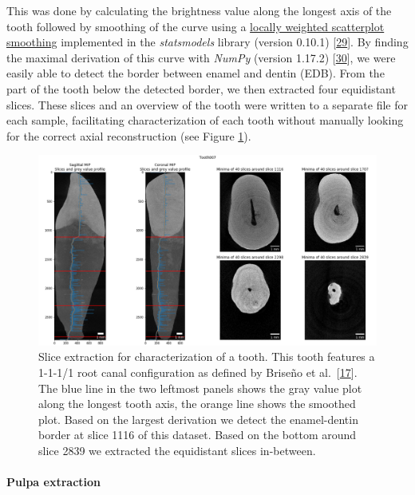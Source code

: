 \documentclass[
  american,
]{article}
\begin{document}
This was done by calculating the brightness value along the longest axis of the tooth followed by smoothing of the curve using a \href{https://www.statsmodels.org/devel/generated/statsmodels.nonparametric.smoothers_lowess.lowess.html}{locally weighted scatterplot smoothing} implemented in the \emph{statsmodels} library (version 0.10.1) {[}\protect\hyperlink{ref-E4OYV0qi}{29}{]}.
By finding the maximal derivation of this curve with \emph{NumPy} (version 1.17.2) {[}\protect\hyperlink{ref-OiM2HfsY}{30}{]}, we were easily able to detect the border between enamel and dentin (EDB).
From the part of the tooth below the detected border, we then extracted four equidistant slices.
These slices and an overview of the tooth were written to a separate file for each sample, facilitating characterization of each tooth without manually looking for the correct axial reconstruction (see Figure \ref{fig:extractedslices}).

\begin{figure}
\hypertarget{fig:extractedslices}{%
\centering
\includegraphics{images/ExtractedSlices.png}
\caption{Slice extraction for characterization of a tooth.
This tooth features a 1-1-1/1 root canal configuration as defined by Briseño et al.~{[}\protect\hyperlink{ref-ZTgDEakx}{17}{]}.
The blue line in the two leftmost panels shows the gray value plot along the longest tooth axis, the orange line shows the smoothed plot.
Based on the largest derivation we detect the enamel-dentin border at slice 1116 of this dataset.
Based on the bottom around slice 2839 we extracted the equidistant slices in-between.}\label{fig:extractedslices}
}
\end{figure}

\hypertarget{pulpa-extraction}{%
\paragraph{Pulpa extraction}\label{pulpa-extraction}}
\end{document}
